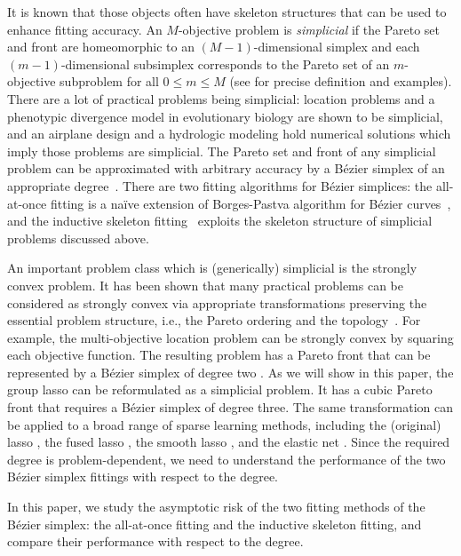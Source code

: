 \documentclass{article}
\begin{document}
It is known that those objects often have skeleton structures that can be used to enhance fitting accuracy.
An $M$-objective problem is \emph{simplicial} if the Pareto set and front are homeomorphic to an $(M-1)$-dimensional simplex and each $(m-1)$-dimensional subsimplex corresponds to the Pareto set of an $m$-objective subproblem for all $0 \le m \le M$ (see \cite{Hamada2019} for precise definition and examples).
There are a lot of practical problems being simplicial: location problems \cite{Kuhn1967} and a phenotypic divergence model in evolutionary biology \cite{Shoval2012} are shown to be simplicial, and an airplane design \cite{Mastroddi2013} and a hydrologic modeling \cite{Vrugt2003} hold numerical solutions which imply those problems are simplicial.
The Pareto set and front of any simplicial problem can be approximated with arbitrary accuracy by a B\'ezier simplex of an appropriate degree~\cite{Kobayashi2019}.
There are two fitting algorithms for B\'ezier simplices: the all-at-once fitting is a na\"ive extension of Borges-Pastva algorithm for B\'ezier curves~\cite{Borges2002}, and the inductive skeleton fitting~\cite{Kobayashi2019} exploits the skeleton structure of simplicial problems discussed above.

An important problem class which is (generically) simplicial is the strongly convex problem.
It has been shown that many practical problems can be considered as strongly convex via appropriate transformations preserving the essential problem structure, i.e., the Pareto ordering and the topology~\cite{Hamada2019}.
For example, the multi-objective location problem \cite{Kuhn1967} can be strongly convex by squaring each objective function.
The resulting problem has a Pareto front that can be represented by a B\'ezier simplex of degree two \cite{Hamada2019}.
As we will show in this paper, the group lasso \cite{Yuan2006} can be reformulated as a simplicial problem.
It has a cubic Pareto front that requires a B\'ezier simplex of degree three.
The same transformation can be applied to a broad range of sparse learning methods, including the (original) lasso \cite{Tibshirani1996}, the fused lasso \cite{Tibshirani2005}, the smooth lasso \cite{Hebiri2011}, and the elastic net \cite{Zou2005}.
Since the required degree is problem-dependent, we need to understand the performance of the two B\'ezier simplex fittings with respect to the degree.

In this paper, we study the asymptotic risk of the two fitting methods of the B\'ezier simplex: the all-at-once fitting and the inductive skeleton fitting, and compare their performance with respect to the degree.
\end{document}
